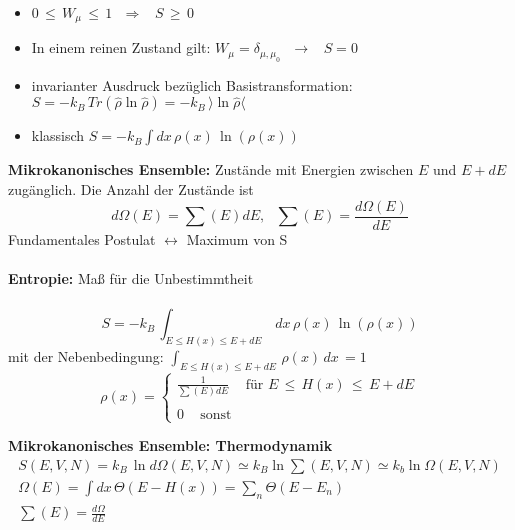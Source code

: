 \documentclass[a4paper,11pt]{scrartcl}
\begin{document}
\begin{itemize}
 \item $0 \, \leq \, W_{\mu} \, \leq\, 1\,\,\,\, \Rightarrow \,\,\,\,\, S \, \geq \, 0$
 \item In einem reinen Zustand gilt: $W_{\mu} = \delta_{\mu, \mu_0} \,\,\,\, \rightarrow \,\,\,\,\, S = 0$
 \item invarianter Ausdruck bezüglich Basistransformation: $ S = -k_B \, Tr(\hat{\rho} \ln{\hat{\rho}})  = -k_B \, \rangle \ln{\hat{\rho}} \langle$
 \item klassisch $S = -k_B \int dx \, \rho(x)\, \ln(\rho(x)) $
\end{itemize}
\textbf{Mikrokanonisches Ensemble:}
Zustände mit Energien zwischen $E$ und $E + dE$ zugänglich. Die Anzahl der Zustände ist 
\begin{equation}
 d \Omega (E) = \sum(E) dE, \,\,\,\, \sum(E) = \frac{d \Omega(E)}{dE}
\end{equation}
Fundamentales Postulat $\leftrightarrow$ Maximum von S\\
\\
\textbf{Entropie:} Maß für die Unbestimmtheit\\
\\
\begin{equation}
 S = -k_B \, \int_{E\leq H(x) \leq E+dE}\, dx\, \rho(x) \, \ln(\rho(x))
\end{equation}
mit der Nebenbedingung: $ \int_{E\leq H(x) \leq E+dE}\, \rho(x) \, dx\, = 1 $\\

\begin{equation}
\rho(x) = \left\{ \begin{array}{c} \frac{1}{\sum(E)dE} \,\,\,\,\,\,\, \mathrm{für} \,\, E\, \leq \, H(x) \, \leq \,E+dE \\ \\ 0\,\,\,\,\,\,\, \mathrm{sonst}  \end{array} \right.
\end{equation}

\textbf{Mikrokanonisches Ensemble: Thermodynamik}\\
\begin{align}
 S(E,V,N) = k_B\, \ln d\Omega(E,V,N) \simeq k_B \ln \sum(E,V,N) \simeq k_b \ln \Omega(E,V,N)\\
 \Omega (E) = \int dx\, \Theta (E-H(x))= \sum_n \Theta(E-E_n)\\
 \sum(E) = \frac{d \Omega}{d E}
\end{align}
\end{document}
